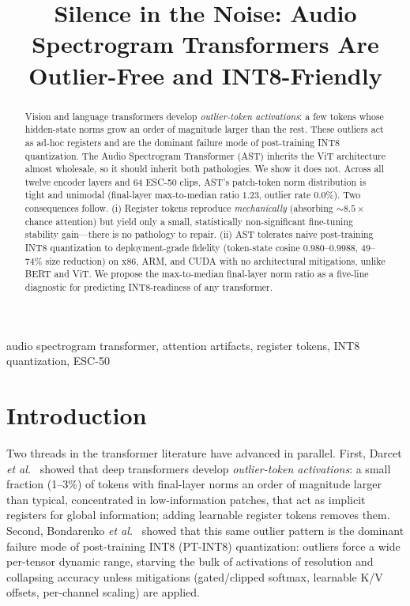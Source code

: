 \documentclass[conference]{IEEEtran}
\begin{document}
\title{Silence in the Noise: Audio Spectrogram Transformers Are Outlier-Free and INT8-Friendly}

\author{
}

\maketitle

\begin{abstract}
Vision and language transformers develop \emph{outlier-token activations}: a few tokens whose hidden-state norms grow an order of magnitude larger than the rest. These outliers act as ad-hoc registers and are the dominant failure mode of post-training INT8 quantization. The Audio Spectrogram Transformer (AST) inherits the ViT architecture almost wholesale, so it should inherit both pathologies. We show it does not. Across all twelve encoder layers and 64 ESC-50 clips, AST's patch-token norm distribution is tight and unimodal (final-layer max-to-median ratio $1.23$, outlier rate $0.0\%$). Two consequences follow. (i) Register tokens reproduce \emph{mechanically} (absorbing $\sim\!8.5\times$ chance attention) but yield only a small, statistically non-significant fine-tuning stability gain---there is no pathology to repair. (ii) AST tolerates naive post-training INT8 quantization to deployment-grade fidelity (token-state cosine $0.980$--$0.9988$, $49$--$74\%$ size reduction) on x86, ARM, and CUDA with no architectural mitigations, unlike BERT and ViT. We propose the max-to-median final-layer norm ratio as a five-line diagnostic for predicting INT8-readiness of any transformer.
\end{abstract}

\begin{IEEEkeywords}
audio spectrogram transformer, attention artifacts, register tokens, INT8 quantization, ESC-50
\end{IEEEkeywords}

\section{Introduction}
Two threads in the transformer literature have advanced in parallel. First, Darcet \emph{et al.}~\cite{darcet2024need} showed that deep transformers develop \emph{outlier-token activations}: a small fraction (1--3\%) of tokens with final-layer norms an order of magnitude larger than typical, concentrated in low-information patches, that act as implicit registers for global information; adding learnable register tokens removes them. Second, Bondarenko \emph{et al.}~\cite{bondarenko2023quantizable} showed that this same outlier pattern is the dominant failure mode of post-training INT8 (PT-INT8) quantization: outliers force a wide per-tensor dynamic range, starving the bulk of activations of resolution and collapsing accuracy unless mitigations (gated/clipped softmax, learnable K/V offsets, per-channel scaling) are applied.
\end{document}
